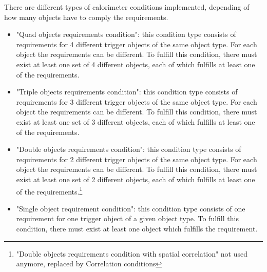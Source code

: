 There are different types of calorimeter conditions implemented, depending of how many objects have to comply the requirements.
\begin{itemize}
\item "Quad objects requirements condition": this condition type consists of requirements for 4 different trigger objects of the same object type. 
For each object the requirements can be different. To fulfill this condition, there must exist at least one set of 4 different objects,
each of which fulfills at least one of the requirements.
\item "Triple objects requirements condition": this condition type consists of requirements for 3 different trigger objects of the same object type. 
For each object the requirements can be different. To fulfill this condition, there must exist at least one set of 3 different objects,
each of which fulfills at least one of the requirements.
\item "Double objects requirements condition": this condition type consists of requirements for 2 different trigger objects of the same object type. 
For each object the requirements can be different. To fulfill this condition, there must exist at least one set of 2 different objects,
each of which fulfills at least one of the requirements.\footnote{"Double objects requirements condition with spatial correlation" not used anymore, replaced by Correlation conditions}
\item "Single object requirement condition": this condition type consists of one requirement for one trigger object of a given object type. 
To fulfill this condition, there must exist at least one object which fulfills the requirement.

\end{itemize}

